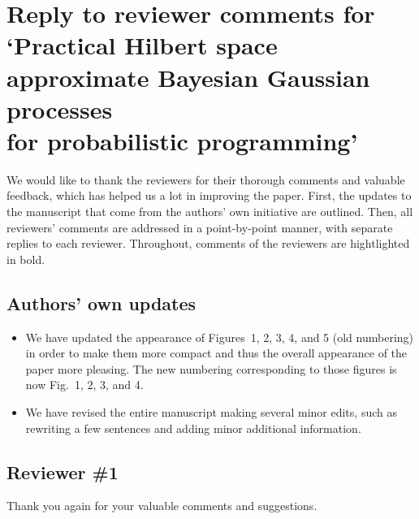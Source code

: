 \documentclass[11pt]{report}
\begin{document}
\section*{\normalsize Reply to reviewer comments for \\ \Large`Practical Hilbert space approximate Bayesian Gaussian processes \\ for probabilistic programming'}

We would like to thank the reviewers for their thorough comments and valuable feedback, which has helped us a lot in improving the paper. First, the updates to the manuscript that come from the authors' own initiative are outlined. Then, all reviewers' comments are addressed in a point-by-point manner, with separate replies to each reviewer. 
Throughout, comments of the reviewers are hightlighted in bold.

\noindent \hdashrule{\textwidth}{0.2pt}{2mm 1pt}

\subsection*{Authors' own updates}

\begin{itemize}

\item We have updated the appearance of Figures~1, 2, 3, 4, and 5 (old numbering) in order to make them more compact and thus the overall appearance of the paper more pleasing. The new numbering corresponding to those figures is now Fig.~1, 2, 3, and 4.

\item We have revised the entire manuscript making several minor edits, such as rewriting a few sentences and adding minor additional information.

\end{itemize}

\noindent \hdashrule{\textwidth}{0.2pt}{2mm 1pt}

\subsection*{Reviewer \#1}

Thank you again for your valuable comments and suggestions.

\end{document}

